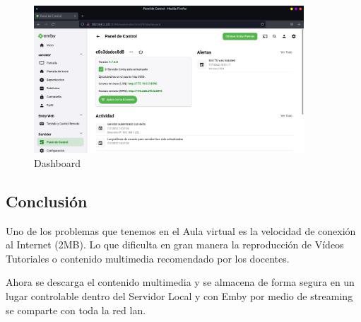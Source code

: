 				\begin{figure}[ht]
					
					\centering
					
					\includegraphics[width=0.9\textwidth]{imagenes/docker/emby/emby-dashboard.png}
					
					\caption{Dashboard}
					
					\label{fig:dashboard}
					
				\end{figure}
					
		\subsection{Conclusión}
		
			Uno de los problemas que tenemos en el Aula virtual es la velocidad de conexión al Internet (2MB). Lo que dificulta en gran manera la reproducción de Vídeos Tutoriales o contenido multimedia recomendado por los docentes.\par
			
			Ahora se descarga el contenido multimedia y se almacena de forma segura en un lugar controlable dentro del Servidor Local y con Emby por medio de streaming se comparte con toda la red lan.\par
	
